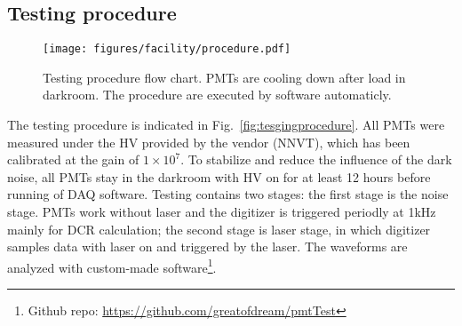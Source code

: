 \subsection{Testing procedure}
\begin{figure}
    \centering
    \texttt{[image: figures/facility/procedure.pdf]}
    \caption{Testing procedure flow chart. PMTs are cooling down after load in darkroom. The procedure are executed by software automaticly.}
    \label{fig:testingprocedure}
\end{figure}
The testing procedure is indicated in Fig.~\ref{fig:tesgingprocedure}. All PMTs were measured under the HV provided by the vendor (NNVT), which has been calibrated at the gain of $1\times10^7$. To stabilize and reduce the influence of the dark noise, all PMTs stay in the darkroom with HV on for at least 12 hours before running of DAQ software. Testing contains two stages: the first stage is the noise stage. PMTs work without laser and the digitizer is triggered periodly at 1kHz mainly for DCR calculation; the second stage is laser stage, in which digitizer samples data with laser on and triggered by the laser. The waveforms are analyzed with custom-made software\footnote{Github repo: \url{https://github.com/greatofdream/pmtTest}}.